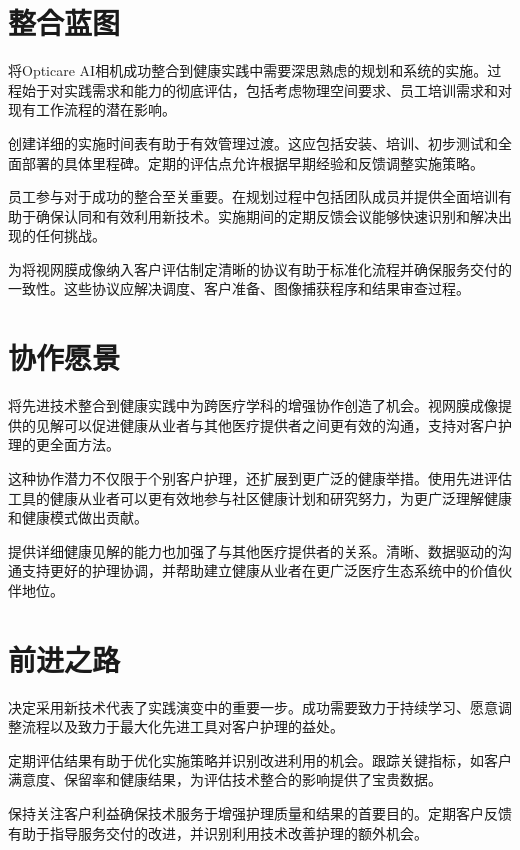 \documentclass[
  Letterpaper,
]{scrbook}
\begin{document}
\section{整合蓝图}\label{ux6574ux5408ux84ddux56fe}

将Opticare
AI相机成功整合到健康实践中需要深思熟虑的规划和系统的实施。过程始于对实践需求和能力的彻底评估，包括考虑物理空间要求、员工培训需求和对现有工作流程的潜在影响。

创建详细的实施时间表有助于有效管理过渡。这应包括安装、培训、初步测试和全面部署的具体里程碑。定期的评估点允许根据早期经验和反馈调整实施策略。

员工参与对于成功的整合至关重要。在规划过程中包括团队成员并提供全面培训有助于确保认同和有效利用新技术。实施期间的定期反馈会议能够快速识别和解决出现的任何挑战。

为将视网膜成像纳入客户评估制定清晰的协议有助于标准化流程并确保服务交付的一致性。这些协议应解决调度、客户准备、图像捕获程序和结果审查过程。

\section{协作愿景}\label{ux534fux4f5cux613fux666f}

将先进技术整合到健康实践中为跨医疗学科的增强协作创造了机会。视网膜成像提供的见解可以促进健康从业者与其他医疗提供者之间更有效的沟通，支持对客户护理的更全面方法。

这种协作潜力不仅限于个别客户护理，还扩展到更广泛的健康举措。使用先进评估工具的健康从业者可以更有效地参与社区健康计划和研究努力，为更广泛理解健康和健康模式做出贡献。

提供详细健康见解的能力也加强了与其他医疗提供者的关系。清晰、数据驱动的沟通支持更好的护理协调，并帮助建立健康从业者在更广泛医疗生态系统中的价值伙伴地位。

\section{前进之路}\label{ux524dux8fdbux4e4bux8def}

决定采用新技术代表了实践演变中的重要一步。成功需要致力于持续学习、愿意调整流程以及致力于最大化先进工具对客户护理的益处。

定期评估结果有助于优化实施策略并识别改进利用的机会。跟踪关键指标，如客户满意度、保留率和健康结果，为评估技术整合的影响提供了宝贵数据。

保持关注客户利益确保技术服务于增强护理质量和结果的首要目的。定期客户反馈有助于指导服务交付的改进，并识别利用技术改善护理的额外机会。
\end{document}
